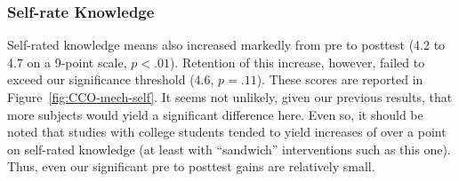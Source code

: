 \subsubsection{Self-rate Knowledge}

Self-rated knowledge means also increased markedly from pre to posttest (4.2
to 4.7 on a 9-point scale, $p<.01$). Retention of this increase, however,
failed to exceed our significance threshold (4.6, $p=.11$). These scores are
reported in Figure~\ref{fig:CCO-mech-self}. It seems not unlikely, given our
previous results, that more subjects would yield a significant difference here.
Even so, it should be noted that studies with college students tended to yield
increases of over a point on self-rated knowledge (at least with “sandwich”
interventions such as this one). Thus, even our significant pre to posttest
gains are relatively small.


